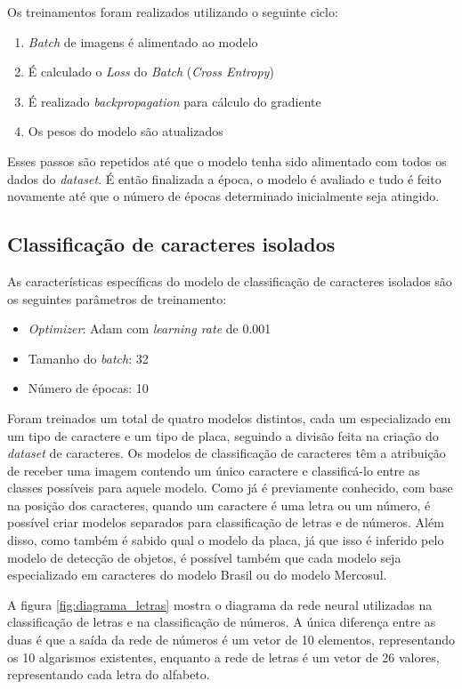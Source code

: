 Os treinamentos foram realizados utilizando o seguinte ciclo:
\begin{enumerate} 
\item \textit{Batch} de imagens é alimentado ao modelo 
\item É calculado o \textit{Loss} do \textit{Batch} (\textit{Cross Entropy}) 
\item É realizado \textit{backpropagation} para cálculo do gradiente 
\item Os pesos do modelo são atualizados 
\end{enumerate}
Esses passos são repetidos até que o modelo tenha sido alimentado com todos os dados do \textit{dataset}. É então finalizada a época, o modelo é avaliado e tudo é feito novamente até que o número de épocas determinado inicialmente seja atingido.

\subsection{Classificação de caracteres isolados}
As características específicas do modelo de classificação de caracteres isolados são os seguintes parâmetros de treinamento:
\begin{itemize} 
\item \textit{Optimizer}: Adam com \textit{learning rate} de 0.001 
\item Tamanho do \textit{batch}: 32 
\item Número de épocas: 10 
\end{itemize}

Foram treinados um total de quatro modelos distintos, cada um especializado em um tipo de caractere e um tipo de placa, seguindo a divisão feita na criação do \textit{dataset} de caracteres. Os modelos de classificação de caracteres têm a atribuição de receber uma imagem contendo um único caractere e classificá-lo entre as classes possíveis para aquele modelo. Como já é previamente conhecido, com base na posição dos caracteres, quando um caractere é uma letra ou um número, é possível criar modelos separados para classificação de letras e de números. Além disso, como também é sabido qual o modelo da placa, já que isso é inferido pelo modelo de detecção de objetos, é possível também que cada modelo seja especializado em caracteres do modelo Brasil ou do modelo Mercosul.

A figura \ref{fig:diagrama_letras} mostra o diagrama da rede neural utilizadas na classificação de letras e na classificação de números. A única diferença entre as duas é que a saída da rede de números é um vetor de 10 elementos, representando os 10 algarismos existentes, enquanto a rede de letras é um vetor de 26 valores, representando cada letra do alfabeto.

